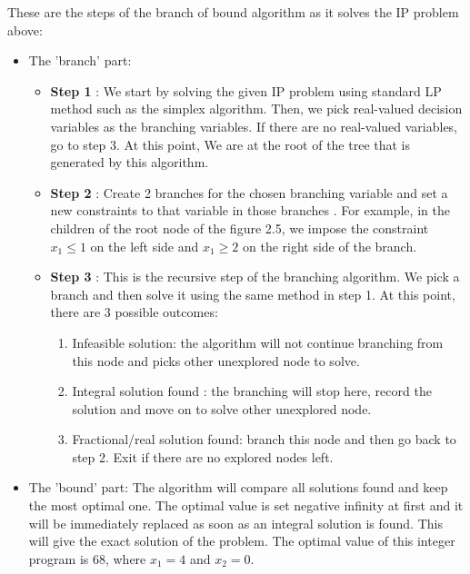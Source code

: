These are the steps of the branch of bound algorithm as it solves the IP problem above:
\begin{itemize}
\item The 'branch' part:
    \begin{itemize}
        \item \textbf{Step 1} : We start by solving the given IP problem using standard LP method such as the simplex algorithm. Then, we pick
         real-valued decision variables as the branching variables. If there are no real-valued variables, go to step 3.
         At this point, We are at the root of the tree that is generated by this algorithm.
        \item \textbf{Step 2} : Create 2 branches for the chosen branching variable and set a new constraints to that variable in those branches
        . For example, in the children of the root node of the figure 2.5,
         we impose the constraint \(x_{1} \leq 1\) on the left side and \(x_{1} \geq 2\) on the right side of the branch.
        \item \textbf{Step 3} : This is the recursive step of the branching algorithm. We pick a branch and then solve it
        using the same method in step 1. At this point, there are 3 possible outcomes:
            \begin{enumerate}
                \item Infeasible solution: the algorithm will not continue branching from this node and picks other unexplored node
                to solve.
                \item Integral solution found : the branching will stop here, record the solution and move on to solve other unexplored node.
                \item Fractional/real solution found: branch this node and then go back to step 2.
                Exit if there are no explored nodes left.
            \end{enumerate}
    \end{itemize}
\item The 'bound' part: The algorithm will compare all solutions found and keep the most optimal one. The optimal value is set negative infinity at first
and it will be immediately replaced as soon as an integral solution is found.
 This will give the exact solution of the problem. The optimal value of this integer program is 68, where \(x_{1} = 4\) and \(x_{2} = 0\).
\end{itemize}

\vspace{0.5cm}

